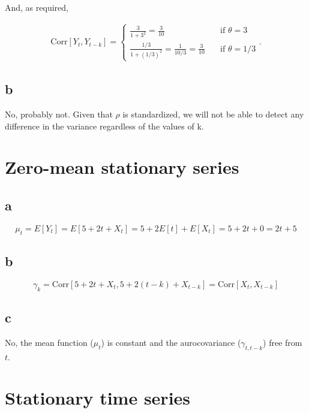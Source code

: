 \documentclass[]{book}
\begin{document}
And, as required,

\begin{gather*}
  \text{Corr}[Y_t, Y_{t-k}] =
  \begin{cases}
    \frac{3}{1+3^2} = \frac{3}{10} & \quad \text{if } \theta = 3\\
    \frac{1/3}{1 + (1/3)^2} = \frac{1}{10/3} = \frac{3}{10}  & \quad \text{if } \theta = 1/3
  \end{cases}.
\end{gather*}

\subsection*{b}\label{b-2}

No, probably not. Given that \(\rho\) is standardized, we will not be
able to detect any difference in the variance regardless of the values
of k.

\section{Zero-mean stationary series}\label{zero-mean-stationary-series}

\subsection*{a}\label{a-3}

\[\mu_t = E[Y_t] = E[5 + 2t + X_t] = 5 + 2E[t] + E[X_t] = 5 + 2t + 0 = 2t + 5\]

\subsection*{b}\label{b-3}

\[ \gamma_k = \text{Corr}[5+2t+X_t, 5+2(t-k)+X_{t-k}] =
  \text{Corr}[X_t, X_{t-k}]\]

\subsection*{c}\label{c-2}

No, the mean function (\(\mu_t\)) is constant and the aurocovariance
(\(\gamma_{t,t-k}\)) free from \(t\).

\section{Stationary time series}\label{stationary-time-series}
\end{document}
